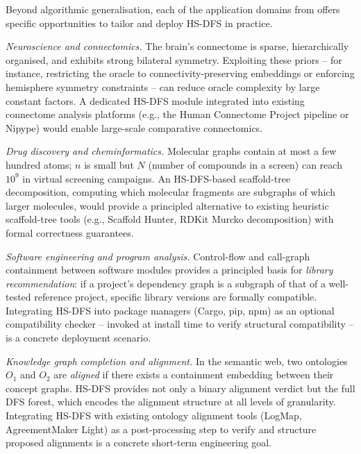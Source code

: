 ﻿\documentclass[12pt,a4paper]{article}
\theoremstyle{plain}
\theoremstyle{definition}
\theoremstyle{remark}
\begin{document}
	Beyond algorithmic generalisation, each of the application domains from
	 offers specific opportunities to tailor and deploy
	HS-DFS in practice.

	\emph{Neuroscience and connectomics.}  The brain's connectome is sparse,
	hierarchically organised, and exhibits strong bilateral symmetry.  Exploiting
	these priors -- for instance, restricting the oracle to
	connectivity-preserving embeddings or enforcing hemisphere symmetry
	constraints -- can reduce oracle complexity by large constant factors.
	A dedicated HS-DFS module integrated into existing connectome analysis
	platforms (e.g., the Human Connectome Project pipeline or Nipype) would
	enable large-scale comparative connectomics.

	\emph{Drug discovery and cheminformatics.}  Molecular graphs contain at
	most a few hundred atoms; $n$ is small but $N$ (number of compounds in a
	screen) can reach $10^9$ in virtual screening campaigns.  An HS-DFS-based
	scaffold-tree decomposition, computing which molecular fragments are
	subgraphs of which larger molecules, would provide a principled alternative
	to existing heuristic scaffold-tree tools (e.g., Scaffold Hunter, RDKit
	Murcko decomposition) with formal correctness guarantees.

	\emph{Software engineering and program analysis.}  Control-flow and
	call-graph containment between software modules provides a principled
	basis for \emph{library recommendation}: if a project's dependency graph
	is a subgraph of that of a well-tested reference project, specific
	library versions are formally compatible.  Integrating HS-DFS into
	package managers (Cargo, pip, npm) as an optional compatibility checker --
	invoked at install time to verify structural compatibility -- is a
	concrete deployment scenario.

	\emph{Knowledge graph completion and alignment.}  In the semantic web,
	two ontologies $O_1$ and $O_2$ are \emph{aligned} if there exists a
	containment embedding between their concept graphs.  HS-DFS provides
	not only a binary alignment verdict but the full DFS forest, which
	encodes the alignment structure at all levels of granularity.  Integrating
	HS-DFS with existing ontology alignment tools (LogMap, AgreementMaker Light)
	as a post-processing step to verify and structure proposed alignments is
	a concrete short-term engineering goal.

\end{document}
